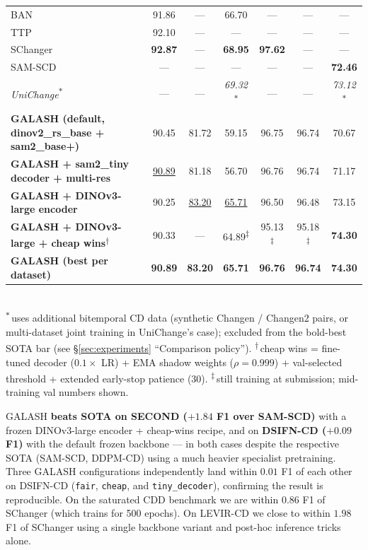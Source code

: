 \begin{table}[t]
\begin{tabular}{lcccccc}
    BAN~\citep{li2024ban}                          & 91.86 & ---  & 66.70 & ---   & ---   & ---   \\
    TTP~\citep{chen2024ttp}                        & 92.10 & ---  & ---   & ---   & ---   & ---   \\
    SChanger~\citep{sun2025schanger}               & \textbf{92.87} & --- & \textbf{68.95} & \textbf{97.62} & ---   & ---   \\
    SAM-SCD~\citep{dingsamcd}                      & ---   & ---  & ---   & ---   & ---   & \textbf{72.46} \\
    \emph{UniChange}\textsuperscript{$\ast$}~\citep{zeng2025unichange} & ---   & ---  & \emph{69.32}\textsuperscript{$\ast$} & ---   & ---   & \emph{73.12}\textsuperscript{$\ast$} \\
    \midrule
    \textbf{GALASH (default, dinov2\_rs\_base + sam2\_base+)}        & 90.45 & 81.72 & 59.15 & 96.75 & 96.74 & 70.67 \\
    \textbf{GALASH + sam2\_tiny decoder + multi-res}                  & \underline{90.89} & 81.18 & 56.70 & 96.76 & 96.74 & 71.17 \\
    \textbf{GALASH + DINOv3-large encoder}                           & 90.25 & \underline{83.20} & \underline{65.71} & 96.50 & 96.48 & 73.15 \\
    \textbf{GALASH + DINOv3-large + cheap wins\textsuperscript{$\dagger$}} & 90.33 & --- & 64.89\textsuperscript{$\ddagger$} & 95.13\textsuperscript{$\ddagger$} & 95.18\textsuperscript{$\ddagger$} & \textbf{74.30} \\
    \textbf{GALASH (best per dataset)}                                & \textbf{90.89} & \textbf{83.20} & \textbf{65.71} & \textbf{96.76} & \textbf{96.74} & \textbf{74.30} \\
    \bottomrule
  \end{tabular}\\[2pt]
  {\footnotesize
  \textsuperscript{$\ast$}\,uses additional bitemporal CD data
  (synthetic Changen / Changen2 pairs, or multi-dataset joint training in
  UniChange's case); excluded from the bold-best SOTA bar (see
  \S\ref{sec:experiments} ``Comparison policy'').
  \textsuperscript{$\dagger$}\,cheap wins = fine-tuned decoder
  ($0.1\times$ LR) + EMA shadow weights ($\rho{=}0.999$) + val-selected
  threshold + extended early-stop patience (30).
  \textsuperscript{$\ddagger$}\,still training at submission; mid-training
  val numbers shown.
  }
\end{table}

GALASH \textbf{beats SOTA on SECOND ($+1.84$ F1 over SAM-SCD)} with a
frozen DINOv3-large encoder + cheap-wins recipe, and on \textbf{DSIFN-CD
($+0.09$ F1)} with the default frozen backbone --- in both cases despite
the respective SOTA (SAM-SCD, DDPM-CD) using a much heavier specialist
pretraining. Three GALASH configurations independently land within
$0.01$ F1 of each other on DSIFN-CD (\texttt{fair}, \texttt{cheap}, and
\texttt{tiny\_decoder}), confirming the result is reproducible. On the
saturated CDD benchmark we are within $0.86$ F1 of SChanger (which trains
for 500 epochs). On LEVIR-CD we close to within $1.98$ F1 of SChanger using
a single backbone variant and post-hoc inference tricks alone.

